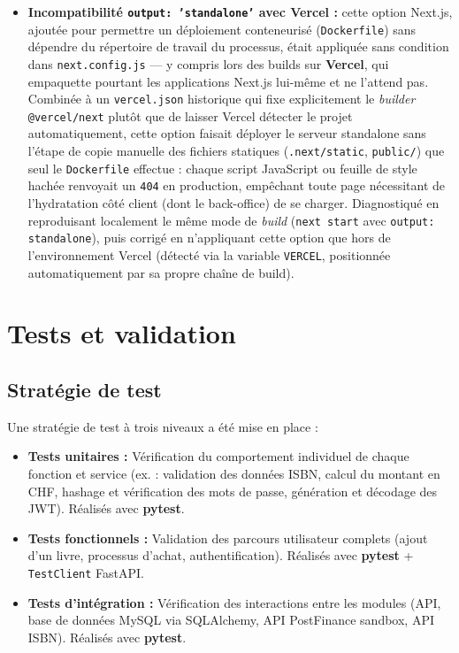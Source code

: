 \documentclass[12pt, a4paper]{report}
\renewcommand{\_}{\origunderscore\allowbreak}
\begin{document}
\begin{itemize}
    \item \textbf{Incompatibilité \texttt{output: 'standalone'} avec Vercel :} cette option Next.js, ajoutée pour permettre un déploiement conteneurisé (\texttt{Dockerfile}) sans dépendre du répertoire de travail du processus, était appliquée sans condition dans \texttt{next.config.js} — y compris lors des builds sur \textbf{Vercel}, qui empaquette pourtant les applications Next.js lui-même et ne l'attend pas. Combinée à un \texttt{vercel.json} historique qui fixe explicitement le \textit{builder} \texttt{@vercel/\allowbreak next} plutôt que de laisser Vercel détecter le projet automatiquement, cette option faisait déployer le serveur \og standalone \fg{} sans l'étape de copie manuelle des fichiers statiques (\texttt{.next/static}, \texttt{public/}) que seul le \texttt{Dockerfile} effectue : chaque script JavaScript ou feuille de style hachée renvoyait un \texttt{404} en production, empêchant toute page nécessitant de l'hydratation côté client (dont le back-office) de se charger. Diagnostiqué en reproduisant localement le même mode de \textit{build} (\texttt{next start} avec \texttt{output: standalone}), puis corrigé en n'appliquant cette option que hors de l'environnement Vercel (détecté via la variable \texttt{VERCEL}, positionnée automatiquement par sa propre chaîne de build).
\end{itemize}

\chapter{Tests et validation}

\section{Stratégie de test}

Une stratégie de test à trois niveaux a été mise en place :

\begin{itemize}
    \item \textbf{Tests unitaires :} Vérification du comportement individuel de chaque fonction et service (ex. : validation des données ISBN, calcul du montant en CHF, hashage et vérification des mots de passe, génération et décodage des JWT). Réalisés avec \textbf{pytest}.
    \item \textbf{Tests fonctionnels :} Validation des parcours utilisateur complets (ajout d'un livre, processus d'achat, authentification). Réalisés avec \textbf{pytest} + \texttt{TestClient} FastAPI.
    \item \textbf{Tests d'intégration :} Vérification des interactions entre les modules (API, base de données MySQL via SQLAlchemy, API PostFinance sandbox, API ISBN). Réalisés avec \textbf{pytest}.
\end{itemize}
\end{document}
